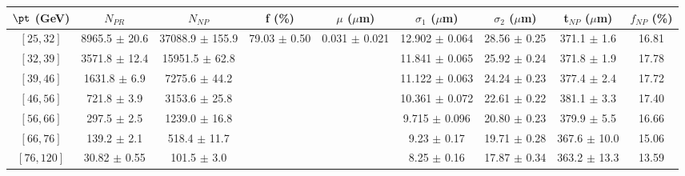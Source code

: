 \begin{tabular}{c||c|c|c|c|c|c|c||c}
$\pt$ (GeV) & $N_{PR}$ & $N_{NP}$ & f (\%) & $\mu$ ($\mu$m) & $\sigma_1$ ($\mu$m) & $\sigma_2$ ($\mu$m)  & t$_{NP}$ ($\mu$m) & $f_{NP}$ (\%) \\
\hline
$[25, 32]$ & 8965.5 $\pm$ 20.6 & 37088.9 $\pm$ 155.9 & \multirow{7}{*}{79.03 $\pm$ 0.50} & \multirow{7}{*}{0.031 $\pm$ 0.021} & 12.902 $\pm$ 0.064 & 28.56 $\pm$ 0.25 & 371.1 $\pm$ 1.6 & 16.81\\
$[32, 39]$ & 3571.8 $\pm$ 12.4 & 15951.5 $\pm$ 62.8 &  &  & 11.841 $\pm$ 0.065 & 25.92 $\pm$ 0.24 & 371.8 $\pm$ 1.9 & 17.78\\
$[39, 46]$ & 1631.8 $\pm$ 6.9 & 7275.6 $\pm$ 44.2 &  &  & 11.122 $\pm$ 0.063 & 24.24 $\pm$ 0.23 & 377.4 $\pm$ 2.4 & 17.72\\
$[46, 56]$ & 721.8 $\pm$ 3.9 & 3153.6 $\pm$ 25.8 &  &  & 10.361 $\pm$ 0.072 & 22.61 $\pm$ 0.22 & 381.1 $\pm$ 3.3 & 17.40\\
$[56, 66]$ & 297.5 $\pm$ 2.5 & 1239.0 $\pm$ 16.8 &  &  & 9.715 $\pm$ 0.096 & 20.80 $\pm$ 0.23 & 379.9 $\pm$ 5.5 & 16.66\\
$[66, 76]$ & 139.2 $\pm$ 2.1 & 518.4 $\pm$ 11.7 &  &  & 9.23 $\pm$ 0.17 & 19.71 $\pm$ 0.28 & 367.6 $\pm$ 10.0 & 15.06\\
$[76, 120]$ & 30.82 $\pm$ 0.55 & 101.5 $\pm$ 3.0 &  &  & 8.25 $\pm$ 0.16 & 17.87 $\pm$ 0.34 & 363.2 $\pm$ 13.3 & 13.59\\
\end{tabular}
